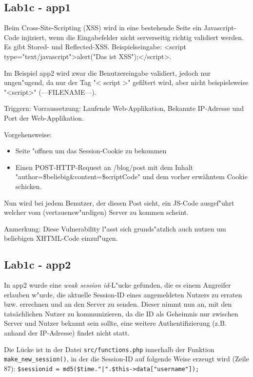\documentclass[12pt,a4paper,titlepage,oneside]{scrartcl}
\begin{document}
\subsection{Lab1c - app1}
Beim Cross-Site-Scripting (XSS) wird in eine bestehende Seite ein Javascript-Code injiziert, wenn die Eingabefelder nicht serverseitig richtig validiert werden.\newline
Es gibt Stored- und Reflected-XSS.
Beispielseingabe: <script type="text/javascript">alert("Das ist XSS");</script>.

Im Beispiel app2 wird zwar die Benutzereingabe validiert, jedoch nur ungen"ugend, da nur der Tag "< script >" gefiltert wird, aber nicht beispielsweise "<script>" (---FILENAME---).

Triggern:
Vorraussetzung: Laufende Web-Applikation, Bekannte IP-Adresse und Port der Web-Applikation.

Vorgehensweise:
\begin{itemize}
	\item Seite "offnen um das Session-Cookie zu bekommen
	\item Einen POST-HTTP-Request an /blog/post mit dem Inhalt "author=\$beliebig\&content=\$scriptCode" und dem vorher erwähntem Cookie schicken.
\end{itemize}

Nun wird bei jedem Benutzer, der diesen Post sieht, ein JS-Code ausgef"uhrt welcher vom (vertauensw"urdigen) Server zu kommen scheint.

Anmerkung: Diese Vulnerability l"asst sich grunds"atzlich auch nutzen um beliebigen XHTML-Code einzuf"ugen.

\subsection{Lab1c - app2}

In app2 wurde eine \textit{weak session id}-L"ucke gefunden, die es einem Angreifer erlauben w"urde, die aktuelle Session-ID eines angemeldeten Nutzers zu erraten bzw. errechnen und an den Server zu senden. Dieser nimmt nun an, mit den tatsächlichen Nutzer zu kommunizieren, da die ID als Geheimnis nur zwischen Server und Nutzer bekannt sein sollte, eine weitere Authentifizierung (z.B. anhand der IP-Adresse) findet nicht statt.

Die Lücke ist in der Datei \texttt{src/functions.php} innerhalb der Funktion \texttt{make\_new\_session()}, in der die Session-ID auf folgende Weise erzeugt wird (Zeile 87): \lstinline{$sessionid = md5($time."|".$this->data["username"]);}
\end{document}
